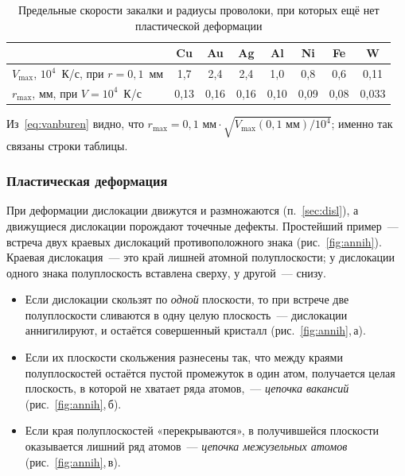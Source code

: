 \begin{table}[ht]
\centering
\caption{Предельные скорости закалки и радиусы проволоки, при которых
ещё нет пластической деформации}
\label{tab:vanburen}
\small
\begin{tabular}{@{}lccccccc@{}}
\toprule
 & Cu & Au & Ag & Al & Ni & Fe & W \\
\midrule
$V_{\max}$, $10^4$~К/с, при $r=0{,}1$~мм & 1,7 & 2,4 & 2,4 & 1,0 & 0,8 & 0,6 & 0,11 \\
$r_{\max}$, мм, при $V=10^4$~К/с & 0,13 & 0,16 & 0,16 & 0,10 & 0,09 & 0,08 & 0,033 \\
\bottomrule
\end{tabular}
\end{table}
\noindent Из~\eqref{eq:vanburen} видно, что $r_{\max}=0{,}1\text{~мм}\cdot
\sqrt{V_{\max}(0{,}1\text{~мм})/10^4}$; именно так связаны строки
таблицы.

\subsubsection{Пластическая деформация}

При деформации дислокации движутся и размножаются (п.~\ref{sec:disl}), а
движущиеся дислокации порождают точечные дефекты. Простейший пример~—
встреча двух краевых дислокаций противоположного знака
(рис.~\ref{fig:annih}). Краевая дислокация~— это край лишней атомной
полуплоскости; у дислокации одного знака полуплоскость вставлена сверху,
у другой~— снизу.

\begin{itemize}
\item Если дислокации скользят по \emph{одной} плоскости, то при встрече
две полуплоскости сливаются в одну целую плоскость~— дислокации
аннигилируют, и остаётся совершенный кристалл (рис.~\ref{fig:annih},\,а).
\item Если их плоскости скольжения разнесены так, что между краями
полуплоскостей остаётся пустой промежуток в один атом, получается целая
плоскость, в которой не хватает ряда атомов,~— \emph{цепочка вакансий}
(рис.~\ref{fig:annih},\,б).
\item Если края полуплоскостей «перекрываются», в получившейся плоскости
оказывается лишний ряд атомов~— \emph{цепочка межузельных атомов}
(рис.~\ref{fig:annih},\,в).
\end{itemize}

